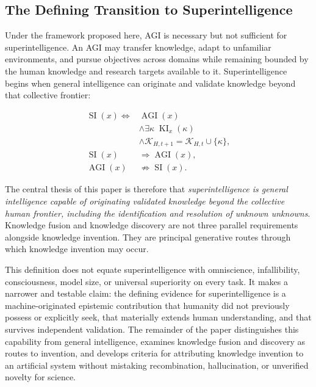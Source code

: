\subsection{\textbf{The Defining Transition to Superintelligence}}

Under the framework proposed here, AGI is necessary but not sufficient for
superintelligence. An AGI may transfer knowledge, adapt to unfamiliar
environments, and pursue objectives across domains while remaining bounded by
the human knowledge and research targets available to it. Superintelligence
begins when general intelligence can originate and validate knowledge beyond
that collective frontier:

\begin{equation}
\begin{aligned}
\operatorname{SI}(x)
\Longleftrightarrow{}&
\operatorname{AGI}(x)\\
&\land \exists\kappa\;\operatorname{KI}_{x}(\kappa)\\
&\land
\mathcal{K}_{H,t+1}
=\mathcal{K}_{H,t}\cup\{\kappa\},\\
\operatorname{SI}(x)
&\Rightarrow \operatorname{AGI}(x),\\
\operatorname{AGI}(x)
&\not\Rightarrow \operatorname{SI}(x).
\end{aligned}
\label{eq:superintelligence_definition}
\end{equation}

The central thesis of this paper is therefore that \emph{superintelligence is
general intelligence capable of originating validated knowledge beyond the
collective human frontier, including the identification and resolution of
unknown unknowns}. Knowledge fusion and knowledge discovery are not three
parallel requirements alongside knowledge invention. They are principal
generative routes through which knowledge invention may occur.

This definition does not equate superintelligence with omniscience,
infallibility, consciousness, model size, or universal superiority on every
task. It makes a narrower and testable claim: the defining evidence for
superintelligence is a machine-originated epistemic contribution that humanity
did not previously possess or explicitly seek, that materially extends human
understanding, and that survives independent validation. The remainder of the
paper distinguishes this capability from general intelligence,
examines knowledge fusion and discovery as routes to invention, and develops
criteria for attributing knowledge invention to an artificial system without
mistaking recombination, hallucination, or unverified novelty for science.
